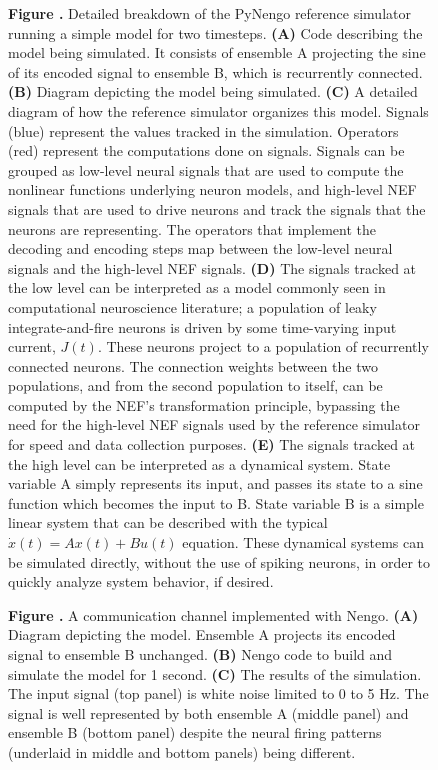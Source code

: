 \documentclass{frontiersSCNS}
\begin{document}
\begin{figure}
 \textbf{\label{fig:sim} Figure .}{
   Detailed breakdown of the PyNengo reference simulator
   running a simple model for two timesteps.
   \textbf{(A)} Code describing the model being simulated.
   It consists of ensemble A projecting the sine of its
   encoded signal to ensemble B,
   which is recurrently connected.
   \textbf{(B)} Diagram depicting the model being simulated.
   \textbf{(C)} A detailed diagram of how the reference simulator
   organizes this model. Signals (blue) represent the values
   tracked in the simulation.
   Operators (red) represent the computations done on signals.
   Signals can be grouped as low-level neural signals
   that are used to compute the nonlinear functions
   underlying neuron models,
   and high-level NEF signals that are used to
   drive neurons and track the signals
   that the neurons are representing.
   The operators that implement the decoding
   and encoding steps map between
   the low-level neural signals
   and the high-level NEF signals.
   \textbf{(D)} The signals tracked at the low level
   can be interpreted as a model
   commonly seen in computational neuroscience literature;
   a population of leaky integrate-and-fire neurons
   is driven by some time-varying input current, $J(t)$.
   These neurons project to a population
   of recurrently connected neurons.
   The connection weights between the two populations,
   and from the second population to itself,
   can be computed by the NEF's transformation
   principle, bypassing the need for
   the high-level NEF signals
   used by the reference simulator
   for speed and data collection purposes.
   \textbf{(E)} The signals tracked at the high level
   can be interpreted as a dynamical system.
   State variable A simply represents its input,
   and passes its state to a sine function
   which becomes the input to B.
   State variable B is a simple linear system
   that can be described with the typical
   $\dot{x}(t) = A x(t) + B u(t)$ equation.
   These dynamical systems can be simulated
   directly, without the use of spiking neurons,
   in order to quickly analyze system behavior,
   if desired.}
\end{figure}

\begin{figure}
 \textbf{\label{fig:comm-channel}
   Figure .}{
   A communication channel implemented with Nengo.
   \textbf{(A)} Diagram depicting the model. Ensemble A
   projects its encoded signal to ensemble B unchanged.
   \textbf{(B)} Nengo code to build and simulate the model
   for 1 second.
   \textbf{(C)} The results of the simulation.
   The input signal (top panel) is white noise limited to 0 to 5 Hz.
   The signal is well represented by both ensemble A (middle panel)
   and ensemble B (bottom panel) despite the neural firing patterns
   (underlaid in middle and bottom panels) being different.}
\end{figure}
\end{document}
